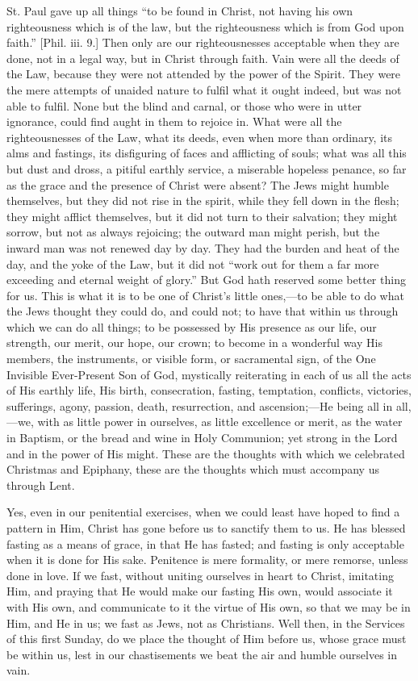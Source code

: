 St. Paul gave up all things ``to be found in Christ, not having
his own righteousness which is of the law, but the righteousness which
is from God upon faith.'' [Phil. iii. 9.] Then only are our
righteousnesses acceptable when they are done, not in a legal way, but
in Christ through faith. Vain were all the deeds of the Law, because
they were not attended by the power of the Spirit. They were the mere
attempts of unaided nature to fulfil what it ought indeed, but was not
able to fulfil. None but the blind and carnal, or those who were in
utter ignorance, could find aught in them to rejoice in. What were all
the righteousnesses of the Law, what its deeds, even when more than
ordinary, its alms and fastings, its disfiguring of faces and
afflicting of souls; what was all this but dust and dross, a pitiful
earthly service, a miserable hopeless penance, so far as the grace and
the presence of Christ were absent? The Jews might humble themselves,
but they did not rise in the spirit, while they fell down in the
flesh; they might afflict themselves, but it did not turn to their
salvation; they might sorrow, but not as always rejoicing; the outward
man might perish, but the inward man was not renewed day by day. They
had the burden and heat of the day, and the yoke of the Law, but it
did not ``work out for them a far more exceeding and eternal
weight of glory.'' But God hath reserved some better thing for us.
This is what it is to be one of Christ's little ones,—to be able to
do what the Jews thought they could do, and could not; to have that
within us through which we can do all things; to be possessed by His
presence as our life, our strength, our merit, our hope, our crown; to
become in a wonderful way His members, the instruments, or visible
form, or sacramental sign, of the One Invisible Ever-Present Son of
God, mystically reiterating in each of us all the acts of His earthly
life, His birth, consecration, fasting, temptation, conflicts,
victories, sufferings, agony, passion, death, resurrection, and
ascension;—He being all in all,—we, with as little power in
ourselves, as little excellence or merit, as the water in Baptism, or
the bread and wine in Holy Communion; yet strong in the Lord and in
the power of His might. These are the thoughts with which we
celebrated Christmas and Epiphany, these are the thoughts which must
accompany us through Lent.

Yes, even in our penitential exercises, when we could least have
hoped to find a pattern in Him, Christ has gone before us to sanctify
them to us. He has blessed fasting as a means of grace, in that He has
fasted; and fasting is only acceptable when it is done for His sake.
Penitence is mere formality, or mere remorse, unless done in love. If
we fast, without uniting ourselves in heart to Christ, imitating Him,
and praying that He would make our fasting His own, would associate it
with His own, and communicate to it the virtue of His own, so that we
may be in Him, and He in us; we fast as Jews, not as Christians. Well
then, in the Services of this first Sunday, do we place the thought of
Him before us, whose grace must be within us, lest in our
chastisements we beat the air and humble ourselves in vain.

